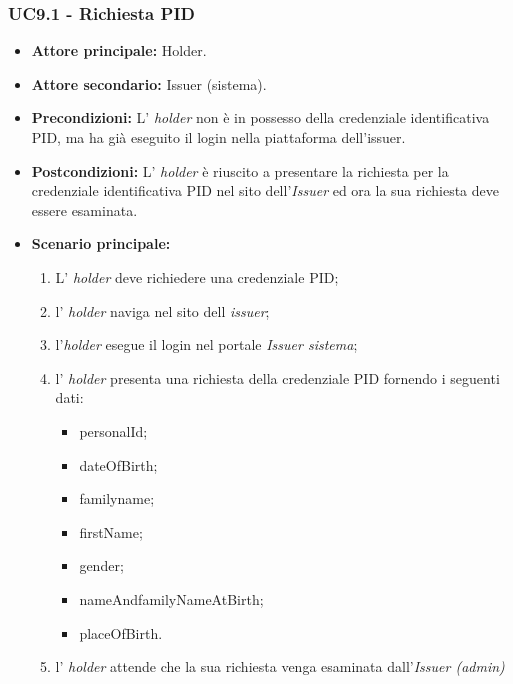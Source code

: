 \subsubsection{UC9.1 - Richiesta PID}
\begin{itemize}
\item \textbf{Attore principale:} Holder.
\item \textbf{Attore secondario:} Issuer (sistema). 
\item \textbf{Precondizioni:} L’ \textit{holder} non è in possesso della credenziale identificativa PID, ma ha già eseguito il login nella piattaforma dell'issuer.
\item \textbf{Postcondizioni:} L’ \textit{holder} è riuscito a presentare la richiesta per la credenziale identificativa PID nel sito dell'\textit{Issuer} ed ora la sua richiesta deve essere esaminata.
\item \textbf{Scenario principale:} 
    \begin{enumerate}
        \item L' \textit{holder} deve richiedere una credenziale PID; 
        \item l' \textit{holder} naviga nel sito dell \textit{issuer};
        \item l'\textit{holder} esegue il login nel portale \textit{Issuer sistema};
        \item l' \textit{holder} presenta una richiesta della credenziale PID fornendo i seguenti dati:
        \begin{itemize}
            \item personalId;
            \item dateOfBirth;
            \item familyname;
            \item firstName;
            \item gender;
            \item nameAndfamilyNameAtBirth;
            \item placeOfBirth.
        \end{itemize}
        \item l' \textit{holder} attende che la sua richiesta venga esaminata dall'\textit{Issuer (admin)}
    \end{enumerate}
\end{itemize}

